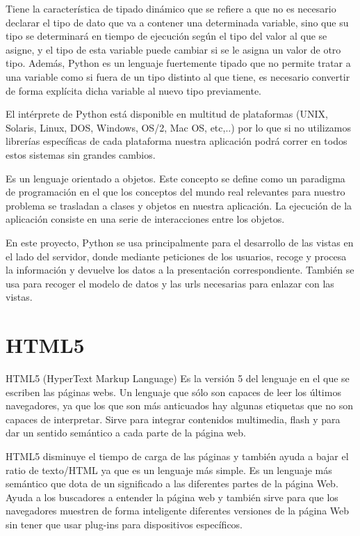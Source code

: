 \documentclass[a4paper, 12pt]{book}
\begin{document}
Tiene la caracter\'istica de tipado din\'amico que se refiere a que no es necesario declarar el tipo de dato que va a contener una determinada 
variable, sino que su tipo se determinar\'a en tiempo de ejecuci\'on seg\'un el tipo del valor al que se asigne, y el tipo de esta variable puede 
cambiar si se le asigna un valor de otro tipo. Adem\'as, Python es un lenguaje fuertemente tipado que no permite tratar a una variable como si fuera 
de un tipo distinto al que tiene, es necesario convertir de forma expl\'icita dicha variable al nuevo tipo previamente. 

El int\'erprete de Python est\'a disponible en multitud de plataformas (UNIX, Solaris, Linux, DOS, Windows, OS/2, Mac OS, etc,..) 
por lo que si no utilizamos librer\'ias espec\'ificas de cada plataforma nuestra aplicaci\'on podr\'a correr en todos estos sistemas sin grandes 
cambios.

Es un lenguaje orientado a objetos. Este concepto se define como un paradigma de programaci\'on en el que los conceptos del mundo real relevantes 
para nuestro problema se trasladan a clases y objetos en nuestra aplicaci\'on. La ejecuci\'on de la aplicaci\'on consiste en una serie de interacciones 
entre los objetos.

En este proyecto, Python se usa principalmente para el desarrollo de las vistas en el lado del servidor, donde mediante 
peticiones de los usuarios, recoge y procesa la informaci\'on y devuelve los datos a la presentaci\'on correspondiente. Tambi\'en se usa para recoger el 
modelo de datos y las urls necesarias para enlazar con las vistas.


\section{HTML5}
\label{sec:html5}
HTML5 (HyperText Markup Language) Es la versi\'on 5 del lenguaje en el que se escriben las p\'aginas webs. Un lenguaje que s\'olo son capaces 
de leer los \'ultimos navegadores, ya que los que son m\'as anticuados hay algunas etiquetas que no son capaces de interpretar. Sirve para integrar 
contenidos multimedia, flash y para dar un sentido sem\'antico a cada parte de la p\'agina web.

HTML5 disminuye el tiempo de carga de las p\'aginas y tambi\'en ayuda a bajar el ratio de texto/HTML ya que es un lenguaje m\'as simple.
Es un lenguaje m\'as sem\'antico que dota de un significado a las diferentes partes de la p\'agina Web. Ayuda a los buscadores a entender la p\'agina 
web y tambi\'en sirve para que los navegadores muestren de forma inteligente diferentes versiones de la p\'agina Web sin tener que usar plug-ins para 
dispositivos espec\'ificos.
\end{document}

